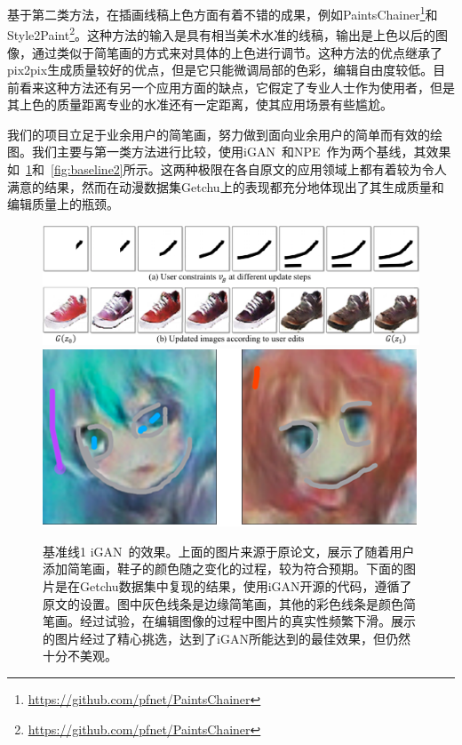 \documentclass[a4paper,12pt,UTF8]{ctexart}
\newcommand{\kai}{\CJKfamily{zhkai}}	%
\begin{document}
基于第二类方法，在插画线稿上色方面有着不错的成果，例如PaintsChainer\footnote{\url{https://github.com/pfnet/PaintsChainer}}和Style2Paint\footnote{\url{https://github.com/pfnet/PaintsChainer}}。这种方法的输入是具有相当美术水准的线稿，输出是上色以后的图像，通过类似于简笔画的方式来对具体的上色进行调节。这种方法的优点继承了pix2pix生成质量较好的优点，但是它只能微调局部的色彩，编辑自由度较低。目前看来这种方法还有另一个应用方面的缺点，它假定了专业人士作为使用者，但是其上色的质量距离专业的水准还有一定距离，使其应用场景有些尴尬。

我们的项目立足于业余用户的简笔画，努力做到面向业余用户的简单而有效的绘图。我们主要与第一类方法进行比较，使用iGAN~\cite{Zhu2016Generative}和NPE~\cite{Brock2016Neural}作为两个基线，其效果如~\ref{fig:baseline1}和~\ref{fig:baseline2}所示。这两种极限在各自原文的应用领域上都有着较为令人满意的结果，然而在动漫数据集Getchu上的表现都充分地体现出了其生成质量和编辑质量上的瓶颈。


\begin{figure}[H]
  \centering
  \includegraphics[width=0.9\linewidth]{figs/baseline_shoe.PNG}
  \includegraphics[width=0.9\linewidth]{figs/baseline1.PNG}
  \caption{\kai 基准线1 iGAN~\cite{Zhu2016Generative}的效果。上面的图片来源于原论文，展示了随着用户添加简笔画，鞋子的颜色随之变化的过程，较为符合预期。下面的图片是在Getchu数据集中复现的结果，使用iGAN开源的代码，遵循了原文的设置。图中灰色线条是边缘简笔画，其他的彩色线条是颜色简笔画。经过试验，在编辑图像的过程中图片的真实性频繁下滑。展示的图片经过了精心挑选，达到了iGAN所能达到的最佳效果，但仍然十分不美观。}
  \label{fig:baseline1}
\end{figure}
\end{document}
